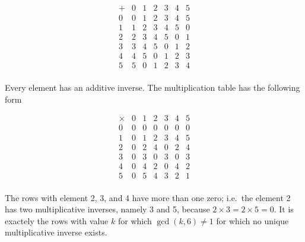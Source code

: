 \[
\begin{array}{c|cccccc}
+  & 0 & 1 & 2 & 3 & 4 & 5 \\
\hline
0  & 0 & 1 & 2 & 3 & 4 & 5 \\
1  & 1 & 2 & 3 & 4 & 5 & 0 \\
2  & 2 & 3 & 4 & 5 & 0 & 1 \\
3  & 3 & 4 & 5 & 0 & 1 & 2 \\
4  & 4 & 5 & 0 & 1 & 2 & 3 \\
5  & 5 & 0 & 1 & 2 & 3 & 4 \\
\end{array}
\]

Every element has an additive inverse. The multiplication table has the
following form

\[
\begin{array}{c|cccccc}
\times  & 0 & 1 & 2 & 3 & 4 & 5 \\
\hline
     0  & 0 & 0 & 0 & 0 & 0 & 0 \\
     1  & 0 & 1 & 2 & 3 & 4 & 5 \\
     2  & 0 & 2 & 4 & 0 & 2 & 4 \\
     3  & 0 & 3 & 0 & 3 & 0 & 3 \\
     4  & 0 & 4 & 2 & 0 & 4 & 2 \\
     5  & 0 & 5 & 4 & 3 & 2 & 1 \\
\end{array}
\]

The rows with element 2, 3, and 4 have more than one zero; i.e.~the
element 2 has two multiplicative inverses, namely 3 and 5, because
\(2\times3=2\times5=0\). It is exactely the rows with value \(k\) for
which \(\gcd(k,6) \neq 1\) for which no unique multiplicative inverse
exists.
